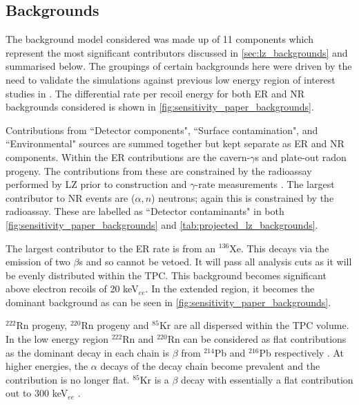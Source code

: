 \subsection{Backgrounds}
\par
The background model considered was made up of 11 components which represent the most significant contributors discussed in \autoref{sec:lz_backgrounds} and summarised below.
The groupings of certain backgrounds here were driven by the need to validate the simulations against previous low energy region of interest studies in \cite{LZ_projected_sensitivity_paper_ref,LZ_Ibles_LZStats_Thesis_ref}.
The differential rate per recoil energy for both ER and NR backgrounds considered is shown in \autoref{fig:sensitivity_paper_backgrounds}.

\par
Contributions from ``Detector components", ``Surface contamination", and ``Environmental" sources are summed together but kept separate as ER and NR components.
Within the ER contributions are the cavern-$\gamma$s and plate-out radon progeny.
The contributions from these are constrained by the radioassay performed by LZ prior to construction \cite{LZ_assay_ref} and $\gamma$-rate measurements \cite{LZ_Gamma_Ray_Background_ref}.
The largest contributor to NR events are ($\alpha,n$) neutrons; again this is constrained by the radioassay.
These are labelled as ``Detector contaminants" in both \autoref{fig:sensitivity_paper_backgrounds} and \autoref{tab:projected_lz_backgrounds}.
\par
The largest contributor to the ER rate is from an $^{136}$Xe.
This decays via the emission of two $\beta$s \cite{xenon136_ref} and so cannot be vetoed.
It will pass all analysis cuts as it will be evenly distributed within the TPC.
This background becomes significant above electron recoils of 20 keV$_{ee}$.
In the extended region, it becomes the dominant background as can be seen in \autoref{fig:sensitivity_paper_backgrounds}.
\par
${}^{222}$Rn progeny, ${}^{220}$Rn progeny and ${}^{85}$Kr are all dispersed within the TPC volume.
In the low energy region ${}^{222}$Rn and ${}^{220}$Rn can be considered as flat contributions as the dominant decay in each chain is $\beta$ from $^{214}$Pb and $^{216}$Pb respectively \cite{LZ_projected_sensitivity_paper_ref}.
At higher energies, the $\alpha$ decays of the decay chain become prevalent and the contribution is no longer flat.
${}^{85}$Kr is a $\beta$ decay with essentially a flat contribution out to 300 keV$_{ee}$ \cite{kr85_rate_ref}.
